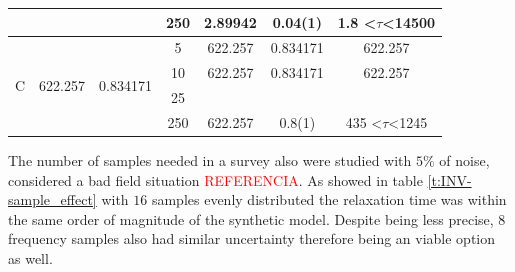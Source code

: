 \documentclass{vie16}
\newcommand{\att}[1]{\textcolor{red}{#1}}
\begin{document}
\begin{table}[H]
\begin{tabular}{@{}|c|c|c|c|c|c|c|@{}}
                   &                          &                            & 250                                                                            & 2.89942         & 0.04(1)           & 1.8 \textless$\tau$\textless 14500  \\ \hline
\multirow{4}{*}{C} & \multirow{4}{*}{622.257} & \multirow{4}{*}{0.834171}  & 5                                                                              & 622.257         & 0.834171          & 622.257                             \\
                   &                          &                            & 10                                                                             & 622.257         & 0.834171          & 622.257                             \\
                   &                          &                            & 25                                                                             &                 &                   &                                     \\
                   &                          &                            & 250                                                                            & 622.257         & 0.8(1)            & 435 \textless $\tau $\textless 1245
\end{tabular}
\end{table}

The number of samples needed in a survey also were studied with $5\%$ of noise, considered a bad %
field situation \att{REFERENCIA}. As showed in table \ref{t:INV-sample_effect} with $16$ samples evenly distributed the relaxation 
time was within the same order of magnitude of the synthetic model. Despite being less precise, $8$ frequency samples also had similar uncertainty therefore being an viable option as well.
\end{document}
